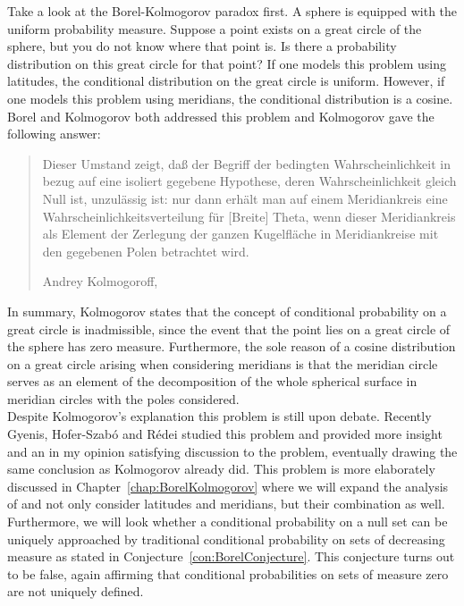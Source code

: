 \documentclass[a4paper]{report}
\theoremstyle{plain}
\theoremstyle{definition}
\theoremstyle{remark}
\numberwithin{equation}{chapter}
\DeclareMathOperator{\1}{\mathbbm{1}}
\begin{document}
Take a look at the Borel-Kolmogorov paradox first. A sphere is equipped with the uniform probability measure. Suppose a point exists on a great circle of the sphere, but you do not know where that point is. Is there a probability distribution on this great circle for that point? If one models this problem using latitudes, the conditional distribution on the great circle is uniform. However, if one models this problem using meridians, the conditional distribution is a cosine.\\
Borel \cite{Borel09} and Kolmogorov \cite{Kolmogorov33} both addressed this problem and Kolmogorov gave the following answer:
\foreignblockquote{ngerman}[Andrey Kolmogoroff, \cite{Kolmogorov33}]{Dieser Umstand zeigt, daß der Begriff der bedingten Wahrscheinlichkeit in bezug auf eine isoliert gegebene Hypothese, deren Wahrscheinlichkeit gleich Null ist, unzulässig ist: nur dann erhält man auf einem Meridiankreis eine Wahrscheinlichkeitsverteilung für [Breite] Theta, wenn dieser Meridiankreis als Element der Zerlegung der ganzen Kugelfläche in Meridiankreise mit den gegebenen Polen betrachtet wird.}
In summary, Kolmogorov states that the concept of conditional probability on a great circle is inadmissible, since the event that the point lies on a great circle of the sphere has zero measure. Furthermore, the sole reason of a cosine distribution on a great circle arising when considering meridians is that the meridian circle serves as an element of the decomposition of the whole spherical surface in meridian circles with the poles considered.\\
Despite Kolmogorov's explanation this problem is still upon debate. Recently Gyenis, Hofer-Szabó and Rédei \cite{Gyenis17} studied this problem and provided more insight and an in my opinion satisfying discussion to the problem, eventually drawing the same conclusion as Kolmogorov already did. This problem is more elaborately discussed in Chapter~\ref{chap:BorelKolmogorov} where we will expand the analysis of \cite{Gyenis17} and not only consider latitudes and meridians, but their combination as well. Furthermore, we will look whether a conditional probability on a null set can be uniquely approached by traditional conditional probability on sets of decreasing measure as stated in Conjecture~\ref{con:BorelConjecture}. This conjecture turns out to be false, again affirming that conditional probabilities on sets of measure zero are not uniquely defined.
\end{document}

